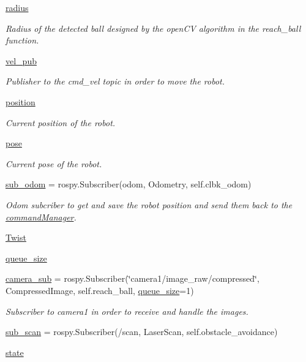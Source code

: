 \begin{DoxyCompactItemize}
\hyperlink{classtrack_1_1TrackAction_a0773416696b3fd6ed1dff306eb26c84a}{radius}
\begin{DoxyCompactList}\small\item\em Radius of the detected ball designed by the open\+CV algorithm in the reach\+\_\+ball function. \end{DoxyCompactList}\item 
\hyperlink{classtrack_1_1TrackAction_af6105c2cad0d325296213d7c03c4fb6e}{vel\+\_\+pub}
\begin{DoxyCompactList}\small\item\em Publisher to the cmd\+\_\+vel topic in order to move the robot. \end{DoxyCompactList}\item 
\hyperlink{classtrack_1_1TrackAction_af8f5740ee3298f2c093006fe1314a268}{position}
\begin{DoxyCompactList}\small\item\em Current position of the robot. \end{DoxyCompactList}\item 
\hyperlink{classtrack_1_1TrackAction_a25be61bbb562612dc1e1c5e7c448fa4c}{pose}
\begin{DoxyCompactList}\small\item\em Current pose of the robot. \end{DoxyCompactList}\item 
\hyperlink{classtrack_1_1TrackAction_a4cbc03d130bcf2203bc68f37d02dc4c5}{sub\+\_\+odom} = rospy.\+Subscriber(\textquotesingle{}odom\textquotesingle{}, Odometry, self.\+clbk\+\_\+odom)
\begin{DoxyCompactList}\small\item\em Odom subcriber to get and save the robot position and send them back to the \hyperlink{namespacecommandManager}{command\+Manager}. \end{DoxyCompactList}\item 
\hyperlink{classtrack_1_1TrackAction_aabd955eb5b74ee508ba27bf6db4129e2}{Twist}
\item 
\hyperlink{classtrack_1_1TrackAction_a47112fa77bb24c45494449d781bd35c4}{queue\+\_\+size}
\item 
\hyperlink{classtrack_1_1TrackAction_a71b1a13ec7fb0ba79d6f34416b7d54e1}{camera\+\_\+sub} = rospy.\+Subscriber(\char`\"{}camera1/image\+\_\+raw/compressed\char`\"{}, Compressed\+Image, self.\+reach\+\_\+ball, \hyperlink{classtrack_1_1TrackAction_a47112fa77bb24c45494449d781bd35c4}{queue\+\_\+size}=1)
\begin{DoxyCompactList}\small\item\em Subscriber to camera1 in order to receive and handle the images. \end{DoxyCompactList}\item 
\hyperlink{classtrack_1_1TrackAction_ae2e92f43c8c834aba95d6c87241553e6}{sub\+\_\+scan} = rospy.\+Subscriber(\textquotesingle{}/scan\textquotesingle{}, Laser\+Scan, self.\+obstacle\+\_\+avoidance)
\item 
\hyperlink{classtrack_1_1TrackAction_a56031d0f135cf2d2f7c950325059f7bd}{state}
\end{DoxyCompactItemize}


